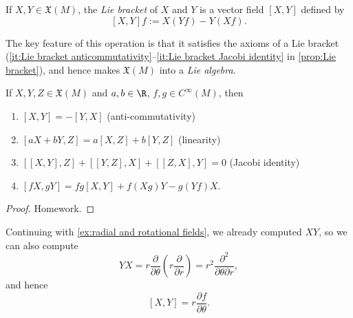 \begin{definition}\label{def:Lie bracket of vector fields}
	If $X,Y \in \mathfrak{X}(M)$, the \emph{Lie bracket} of $X$ and $Y$ is a vector field $[X,Y]$ defined by
	\[
		[X,Y]f := X(Yf)-Y(Xf).
	\]
\end{definition}

The key feature of this operation is that it satisfies the axioms of a Lie bracket (\ref{it:Lie bracket anticommutativity}--\ref{it:Lie bracket Jacobi identity} in \cref{prop:Lie bracket}), and hence makes $\mathfrak{X}(M)$ into a \emph{Lie algebra}.

\begin{proposition}\label{prop:Lie bracket}
	If $X,Y,Z \in \mathfrak{X}(M)$ and $a,b \in \R$, $f, g \in C^\infty(M)$, then
	\begin{enumerate}
		\item \label{it:Lie bracket anticommutativity} $[X,Y]=-[Y,X]$ (anti-commutativity)
		\item \label{it:Lie bracket linearity} $[aX+bY,Z]=a[X,Z]+b[Y,Z]$ (linearity)
		\item \label{it:Lie bracket Jacobi identity} $[[X,Y],Z]+[[Y,Z],X]+[[Z,X],Y]=0$ (Jacobi identity)
		\item $[fX,gY]=fg[X,Y]+f(Xg)Y-g(Yf)X$.
	\end{enumerate}
\end{proposition}

\begin{proof}
	Homework.
\end{proof}

\begin{example}
	Continuing with \cref{ex:radial and rotational fields}, we already computed $XY$, so we can also compute 
	\[
		YX = r \frac{\partial}{\partial \theta} \left( r \frac{\partial}{\partial r}\right) = r^2 \frac{\partial^2}{\partial \theta \partial r},
	\]
	and hence
	\[
		[X,Y] = r \frac{\partial f}{\partial \theta}.
	\]
\end{example}

